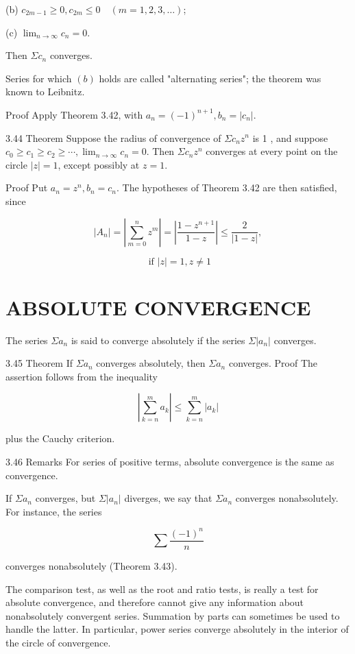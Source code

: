 \documentclass[10pt]{article}
\begin{document}
(b) $c_{2 m-1} \geq 0, c_{2 m} \leq 0 \quad(m=1,2,3, \ldots)$;

(c) $\lim _{n \rightarrow \infty} c_{n}=0$.

Then $\Sigma c_{n}$ converges.

Series for which $(b)$ holds are called "alternating series"; the theorem was known to Leibnitz.

Proof Apply Theorem 3.42, with $a_{n}=(-1)^{n+1}, b_{n}=\left|c_{n}\right|$.

3.44 Theorem Suppose the radius of convergence of $\Sigma c_{n} z^{n}$ is 1 , and suppose $c_{0} \geq c_{1} \geq c_{2} \geq \cdots, \lim _{n \rightarrow \infty} c_{n}=0$. Then $\Sigma c_{n} z^{n}$ converges at every point on the circle $|z|=1$, except possibly at $z=1$.

Proof Put $a_{n}=z^{n}, b_{n}=c_{n}$. The hypotheses of Theorem 3.42 are then satisfied, since

$$
\left|A_{n}\right|=\left|\sum_{m=0}^{n} z^{m}\right|=\left|\frac{1-z^{n+1}}{1-z}\right| \leq \frac{2}{|1-z|},
$$

$$
\text { if }|z|=1, z \neq 1
$$

\section{ABSOLUTE CONVERGENCE}
The series $\Sigma a_{n}$ is said to converge absolutely if the series $\Sigma\left|a_{n}\right|$ converges.

3.45 Theorem If $\Sigma a_{n}$ converges absolutely, then $\Sigma a_{n}$ converges. Proof The assertion follows from the inequality

$$
\left|\sum_{k=n}^{m} a_{k}\right| \leq \sum_{k=n}^{m}\left|a_{k}\right|
$$

plus the Cauchy criterion.

3.46 Remarks For series of positive terms, absolute convergence is the same as convergence.

If $\Sigma a_{n}$ converges, but $\Sigma\left|a_{n}\right|$ diverges, we say that $\Sigma a_{n}$ converges nonabsolutely. For instance, the series

$$
\sum \frac{(-1)^{n}}{n}
$$

converges nonabsolutely (Theorem 3.43).

The comparison test, as well as the root and ratio tests, is really a test for absolute convergence, and therefore cannot give any information about nonabsolutely convergent series. Summation by parts can sometimes be used to handle the latter. In particular, power series converge absolutely in the interior of the circle of convergence.
\end{document}

